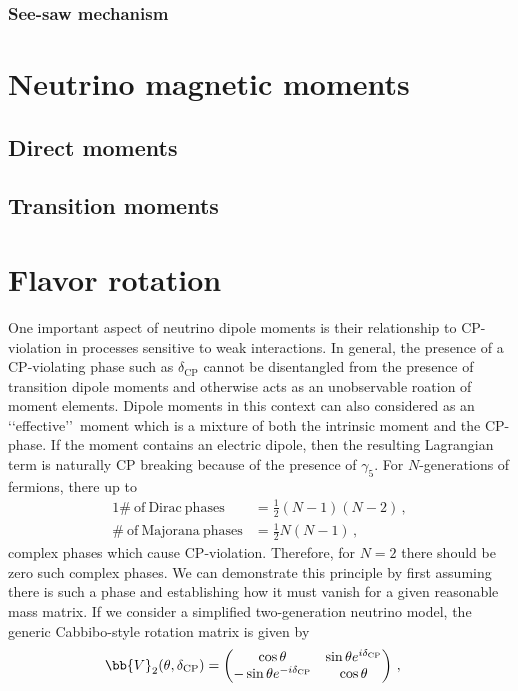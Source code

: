             \subsubsection{See-saw mechanism}
    \section{Neutrino magnetic moments}
        \subsection{Direct moments}
        \subsection{Transition moments}

\section{Flavor rotation}
\noindent One important aspect of neutrino dipole moments is their relationship to CP-violation in processes sensitive to weak interactions. In general, the presence of a CP-violating phase such as $\delta_{\mathrm{CP}}$ cannot be disentangled from the presence of transition dipole moments and otherwise acts as an unobservable roation of moment elements. Dipole moments in this context can also considered as an \lq\lq effective\rq\rq\ moment which is a mixture of both the intrinsic moment and the CP-phase. If the moment contains an electric dipole, then the resulting Lagrangian term is naturally CP breaking because of the presence of $\gamma_{5}$. For $N$-generations of fermions, there up to
\begin{alignat}{1}
	\label{cp:eq:01a} \#\ \mathrm{of}\ \mathrm{Dirac}\ \mathrm{phases} &= \frac{1}{2}(N-1)(N-2)\,,\\
	\label{cp:eq:01b} \#\ \mathrm{of}\ \mathrm{Majorana}\ \mathrm {phases} &= \frac{1}{2}N(N-1)\,,
\end{alignat}
complex phases which cause CP-violation. Therefore, for $N=2$ there should be zero such complex phases. We can demonstrate this principle by first assuming there is such a phase and establishing how it must vanish for a given reasonable mass matrix. If we consider a simplified two-generation neutrino model, the generic Cabbibo-style rotation matrix is given by
\begin{alignat}{1}
	\label{cp:eq:02} \bb{V}_{2}(\theta,\delta_{\mathrm{CP}}) &= 
	\begin{pmatrix}
		\cos{\theta}& \sin{\theta}e^{i\delta_{\mathrm{CP}}} \\
		-\sin{\theta}e^{-i\delta_{\mathrm{CP}}} & \cos{\theta}
	\end{pmatrix}\,,
\end{alignat}

